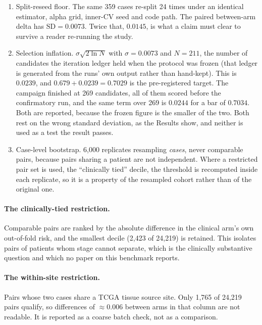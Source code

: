 \begin{enumerate}
  \item Split-reseed floor. The same 359 cases re-split 24 times under an identical
    estimator, alpha grid, inner-CV seed and code path. The paired between-arm delta has
    $\mathrm{SD}=0.0073$. Twice that, $0.0145$, is what a claim must clear to survive a reader
    re-running the study.
  \item Selection inflation. $\sigma\sqrt{2\ln N}$ with $\sigma=0.0073$ and $N=211$, the
    number of candidates the iteration ledger held when the protocol was frozen (that ledger is
    generated from the runs' own output rather than hand-kept). This is $0.0239$, and
    $0.679+0.0239=0.7029$ is the pre-registered target. The campaign finished at 269 candidates,
    all of them scored before the confirmatory run, and the same term over 269 is $0.0244$ for a
    bar of $0.7034$. Both are reported, because the frozen figure is the smaller of the two.
    Both rest on the wrong standard deviation, as the Results show, and neither is used as a test
    the result passes.
  \item Case-level bootstrap. 6{,}000 replicates resampling \emph{cases}, never comparable
    pairs, because pairs sharing a patient are not independent. Where a restricted pair set is used, the ``clinically tied'' decile, the threshold is recomputed inside each replicate, so it
    is a property of the resampled cohort rather than of the original one.
\end{enumerate}

\paragraph{The clinically-tied restriction.} Comparable pairs are ranked by the absolute difference
in the clinical arm's own out-of-fold risk, and the smallest decile (2{,}423 of 24{,}219) is
retained. This isolates pairs of patients whom stage cannot separate, which is the clinically
substantive question and which no paper on this benchmark reports.

\paragraph{The within-site restriction.} Pairs whose two cases share a TCGA tissue source site.
Only 1{,}765 of 24{,}219 pairs qualify, so differences of $\approx0.006$ between arms in that column
are not readable. It is reported as a coarse batch check, not as a comparison.

